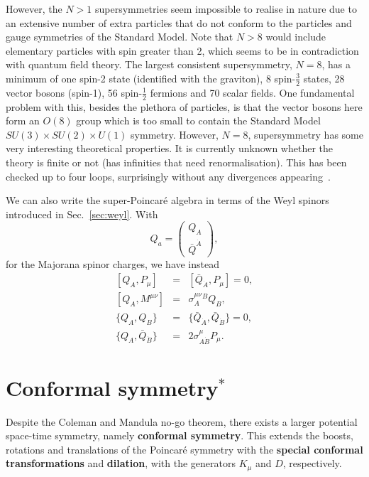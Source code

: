 \documentclass[notes.tex]{subfiles}
\begin{document}
However, the $N>1$ supersymmetries seem impossible to realise in nature due to an extensive number of extra particles that do not conform to the particles and gauge symmetries of the Standard Model. Note that $N>8$ would include elementary particles with spin greater than 2, which seems to be in contradiction with quantum field theory.
The largest consistent supersymmetry, $N=8$, has a minimum of one spin-2 state (identified with the graviton), 8 spin-$\frac{3}{2}$ states, 28 vector bosons (spin-1),  56 spin-$\frac{1}{2}$ fermions and 70 scalar fields. One fundamental problem with this, besides the plethora of particles, is that the vector bosons here form an $O(8)$ group which is too small to contain the Standard Model $SU(3)\times SU(2)\times U(1)$ symmetry. However, $N=8$, supersymmetry has some very interesting theoretical properties. It is currently unknown whether the theory is finite or not (has infinities that need renormalisation). This has been checked up to four loops, surprisingly without any divergences appearing~\cite{Bern:2009kd}.

We can also write the super-Poincaré algebra in terms of the Weyl spinors introduced in Sec.~\ref{sec:weyl}. With 
\begin{equation}
Q_a=\begin{pmatrix} Q_A\\ \bar{Q}^{\dot{A}} \end{pmatrix},
\end{equation}
for the Majorana spinor charges, we have instead
\begin{eqnarray}
\left[Q_A, P_\mu\right] &=& [\bar{Q}_{\dot{A}}, P_\mu] = 0, \label{eq:QPweyl}\\
\left[Q_A, M^{\mu \nu}\right] &=& \sigma^{\mu\nu}_A{}^B Q_B,  \label{eq:QMweyl}\\
\{Q_A, Q_B\} &=& \{\bar{Q}_{\dot{A}}, \bar{Q}_{\dot{B}}\} = 0,\label{eq:QQweyl}\\
\{Q_A, \bar{Q}_{\dot{B}}\} &=& 2\sigma^\mu_{A\dot{B}}P_\mu. \label{eq:QQbarweyl}
\end{eqnarray}



\section{Conformal symmetry$^*$}
Despite the Coleman and Mandula no-go theorem, there exists a larger potential space-time symmetry, namely {\bf conformal symmetry}. This extends the boosts, rotations and translations of the Poincaré symmetry with the {\bf special conformal transformations} and {\bf dilation},  with the generators $K_\mu$ and $D$, respectively. 
\end{document}
